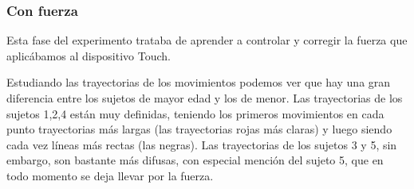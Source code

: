 \documentclass[a4paper,11pt, oneside]{book}
\begin{document}
\subsubsection{Con fuerza}

Esta fase del experimento trataba de aprender a controlar y corregir la fuerza que aplicábamos al dispositivo Touch.

Estudiando las trayectorias de los movimientos podemos ver que hay una gran diferencia entre los sujetos de mayor edad y los de menor. Las trayectorias de los sujetos 1,2,4 están muy definidas, teniendo los primeros movimientos en cada punto trayectorias más largas (las trayectorias rojas más claras) y luego siendo cada vez líneas más rectas (las negras). Las trayectorias de los sujetos 3 y 5, sin embargo, son bastante más difusas, con especial mención del sujeto 5, que en todo momento se deja llevar por la fuerza.
\end{document}
